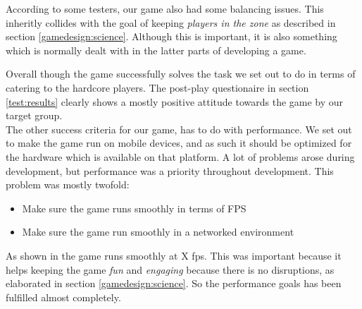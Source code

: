 According to some testers, our game also had some balancing issues. This inheritly collides with the goal of keeping \emph{players in the zone} as described in section \ref{gamedesign:science}. Although this is important, it is also something which is normally dealt with in the latter parts of developing a game.

Overall though the game successfully solves the task we set out to do in terms of catering to the hardcore players. The post-play questionaire in section \ref{test:results} clearly shows a mostly positive attitude towards the game by our target group.\\

The other success criteria for our game, has to do with performance. We set out to make the game run on mobile devices, and as such it should be optimized for the hardware which is available on that platform. A lot of problems arose during development, but performance was a priority throughout development. This problem was mostly twofold:

\begin{itemize}
\item Make sure the game runs smoothly in terms of FPS 
\item Make sure the game run smoothly in a networked environment
\end{itemize}

As shown in  the game runs smoothly at X fps. This was important because it helps keeping the game \emph{fun} and \emph{engaging} because there is no disruptions, as elaborated in section \ref{gamedesign:science}.  So the performance goals has been fulfilled almost completely. 

